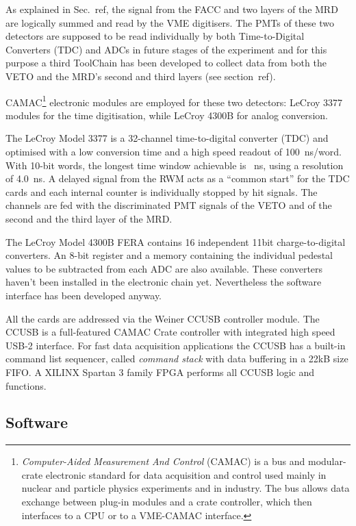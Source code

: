  As explained in Sec.~ref, the signal from the FACC %
 and two layers of the MRD are logically summed and read by the VME digitisers.
 The PMTs of these two detectors are supposed to be read individually by both Time-to-Digital %
 Converters (TDC) and ADCs in future stages of the experiment and for this purpose %
 a third ToolChain has been developed to collect data from both the VETO and %
 the MRD's second and third layers (see section~ref).

 CAMAC\footnote{\emph{Computer-Aided Measurement And Control} (CAMAC) is a bus and modular-crate electronic %
 standard for data acquisition and control used mainly in nuclear and particle physics experiments %
 and in industry.
 The bus allows data exchange between plug-in modules and a crate controller, %
 which then interfaces to a CPU or to a VME-CAMAC interface.} %
 electronic modules are employed for these two detectors: LeCroy 3377 modules for the time %
 digitisation, while LeCroy 4300B for analog conversion.

 The LeCroy Model 3377 is a 32-channel time-to-digital converter (TDC) and %
 optimised with a low conversion time and a high speed readout of 100~ns/word.
 With 10-bit words, the longest time window achievable is ~ns, using a resolution %
 of 4.0~ns.
 A delayed signal from the RWM acts as a ``common start'' for the TDC cards and %
 each internal counter is individually stopped by hit signals.
 The channels are fed with the discriminated PMT signals of the VETO and of the second %
 and the third layer of the MRD.
 
 The LeCroy Model 4300B FERA contains 16 independent 11bit charge-to-digital converters.
 An 8-bit register and a memory containing the individual pedestal values to be subtracted from %
 each ADC are also available.
 These converters haven't been installed in the electronic chain yet.
 Nevertheless the software interface has been developed anyway.
 
 All the cards are addressed via the Weiner CCUSB controller module. 
 The CCUSB is a full-featured CAMAC Crate controller with integrated high speed USB-2 %
 interface.
 For fast data acquisition applications the CCUSB has a built-in command list sequencer, called %
 \emph{command stack} with data buffering in a 22kB size FIFO.
 A XILINX Spartan 3 family FPGA performs all CCUSB logic and functions. 

\subsection{Software}
\label{sec:mrdchain_s}

